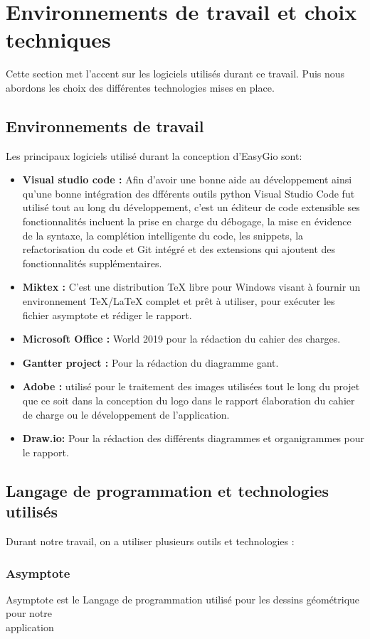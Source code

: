 \documentclass[a4paper]{report}
\begin{document}
\section{Environnements de travail et choix techniques}
Cette section met l’accent sur les logiciels utilisés durant ce travail. Puis nous abordons les choix des différentes technologies mises en place.
\subsection{Environnements de travail}
Les principaux logiciels utilisé durant la conception d'EasyGio sont:
\begin{itemize}
    \item \textbf{Visual studio code :} Afin d’avoir une bonne aide au développement ainsi qu’une bonne intégration des dfférents outils python Visual Studio Code fut utilisé tout au long du développement, c'est un éditeur de code extensible ses fonctionnalités incluent la prise en charge du débogage, la mise en évidence de la syntaxe, la complétion intelligente du code, les snippets, la refactorisation du code et Git intégré et des extensions qui ajoutent des  fonctionnalités supplémentaires.
    \item  \textbf{Miktex :} C'est une distribution TeX libre pour Windows visant à fournir un environnement TeX/LaTeX complet et prêt à utiliser, pour exécuter les fichier asymptote et rédiger le rapport.
    \item  \textbf{Microsoft Office :} World 2019 pour la rédaction du cahier des charges.
    \item  \textbf{Gantter project :} Pour la rédaction du diagramme gant.
    \item  \textbf{Adobe :} utilisé pour le traitement des images utilisées tout le long du projet que ce soit dans la conception du logo dans le rapport élaboration du cahier de charge ou le développement de l’application.
    \item  \textbf{Draw.io:} Pour la rédaction des différents diagrammes et organigrammes pour le rapport.
\end{itemize}
\subsection{Langage de programmation et technologies utilisés}
Durant notre travail, on a utiliser plusieurs outils et technologies :
\subsubsection{Asymptote}
Asymptote est le Langage de programmation utilisé pour les dessins géométrique pour notre \\application 
\end{document}
